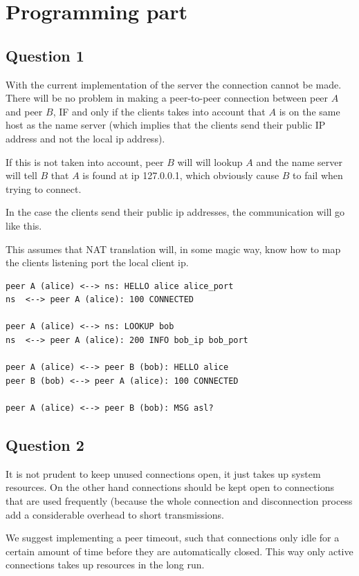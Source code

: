 \section{Programming part}
\subsection{Question 1}
With the current implementation of the server the connection cannot be made.
There will be no problem in making a peer-to-peer connection between peer $A$
and peer $B$, IF and only if the clients takes into account that $A$ is on the
same host as the name server (which implies that the clients send their public IP
address and not the local ip address).

If this is not taken into account, peer $B$ will will lookup $A$ and the name
server will tell $B$ that $A$ is found at ip 127.0.0.1, which obviously cause
$B$ to fail when trying to connect.

In the case the clients send their public ip addresses, the communication will
go like this.

This assumes that NAT translation will, in some magic way, know how to
map the clients listening port the local client ip.

\begin{lstlisting}
peer A (alice) <--> ns: HELLO alice alice_port
ns  <--> peer A (alice): 100 CONNECTED

peer A (alice) <--> ns: LOOKUP bob
ns  <--> peer A (alice): 200 INFO bob_ip bob_port

peer A (alice) <--> peer B (bob): HELLO alice
peer B (bob) <--> peer A (alice): 100 CONNECTED

peer A (alice) <--> peer B (bob): MSG asl?
\end{lstlisting}

\subsection{Question 2}
It is not prudent to keep unused connections open, it just takes up system
resources. On the other hand connections should be kept open to connections
that are used frequently (because the whole connection and disconnection
process add a considerable overhead to short transmissions.

We suggest implementing a peer timeout, such that connections only idle for a
certain amount of time before they are automatically closed. This way only
active connections takes up resources in the long run.

